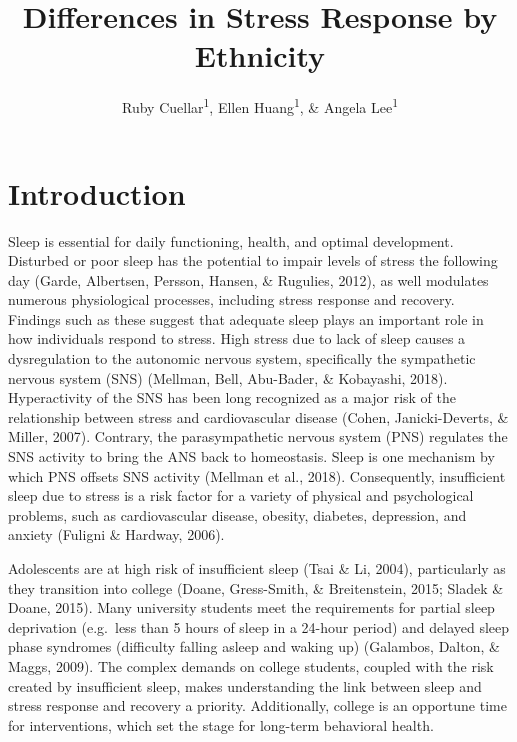 \documentclass[man, fleqn, noextraspace]{apa6}
\title{Differences in Stress Response by Ethnicity}
\author{Ruby Cuellar\textsuperscript{1}, Ellen Huang\textsuperscript{1}, \& Angela Lee\textsuperscript{1}}
\date{}
\affiliation{
\vspace{0.5cm}
\textsuperscript{1} University of Oregon}
\begin{document}
\maketitle

\hypertarget{introduction}{%
\section{Introduction}\label{introduction}}

Sleep is essential for daily functioning, health, and optimal development. Disturbed or poor sleep has the potential to impair levels of stress the following day (Garde, Albertsen, Persson, Hansen, \& Rugulies, 2012), as well modulates numerous physiological processes, including stress response and recovery. Findings such as these suggest that adequate sleep plays an important role in how individuals respond to stress. High stress due to lack of sleep causes a dysregulation to the autonomic nervous system, specifically the sympathetic nervous system (SNS) (Mellman, Bell, Abu-Bader, \& Kobayashi, 2018). Hyperactivity of the SNS has been long recognized as a major risk of the relationship between stress and cardiovascular disease (Cohen, Janicki-Deverts, \& Miller, 2007). Contrary, the parasympathetic nervous system (PNS) regulates the SNS activity to bring the ANS back to homeostasis. Sleep is one mechanism by which PNS offsets SNS activity (Mellman et al., 2018). Consequently, insufficient sleep due to stress is a risk factor for a variety of physical and psychological problems, such as cardiovascular disease, obesity, diabetes, depression, and anxiety (Fuligni \& Hardway, 2006).

Adolescents are at high risk of insufficient sleep (Tsai \& Li, 2004), particularly as they transition into college (Doane, Gress-Smith, \& Breitenstein, 2015; Sladek \& Doane, 2015). Many university students meet the requirements for partial sleep deprivation (e.g.~less than 5 hours of sleep in a 24-hour period) and delayed sleep phase syndromes (difficulty falling asleep and waking up) (Galambos, Dalton, \& Maggs, 2009). The complex demands on college students, coupled with the risk created by insufficient sleep, makes understanding the link between sleep and stress response and recovery a priority. Additionally, college is an opportune time for interventions, which set the stage for long-term behavioral health.
\end{document}
